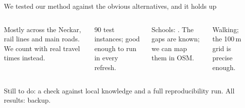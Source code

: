 \documentclass[aspectratio=169,10pt]{beamer}
\begin{document}
\begin{frame}{We tested our method against the obvious alternatives, and it holds up}
  \begin{columns}[T,onlytextwidth]
      \par\smallskip
      {\footnotesize Mostly across the Neckar, rail lines and main roads. We count with real
      travel times instead.}
      \par\smallskip
      {\footnotesize 90 test instances; good enough to run in every refresh.}
      \par\smallskip
      {\footnotesize Schools: \factVTwoSchoolRecall. The gaps are known; we can map them in
      OSM.}
      \par\smallskip
      {\footnotesize Walking; the 100\,m grid is precise enough.}
  \end{columns}
  \vfill
  {\footnotesize\color{muted}Still to do: a check against local knowledge and a full
  reproducibility run. All results: backup.}
\end{frame}
\end{document}
